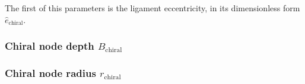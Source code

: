       The first of this parameters is the ligament eccentricity, in its dimensionless form $\hat{e}_{\mathrm{chiral}}$.

    \subsubsection{Chiral node depth $B_{\mathrm{chiral}}$}


    \subsubsection{Chiral node radius $r_{\mathrm{chiral}}$}


